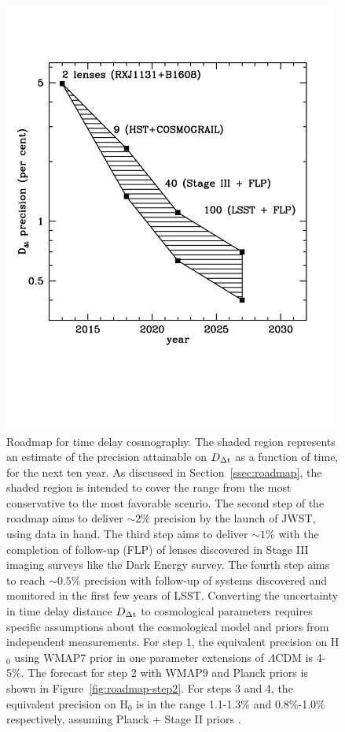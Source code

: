 \begin{figure}
\includegraphics[width=0.98\textwidth]{figures/roadmap.pdf}
\caption{Roadmap for time delay cosmography. The shaded region represents an estimate of the precision attainable on $D_{\Delta{\rm t}}$ as a function of time, for the next ten year. As discussed in Section~\ref{ssec:roadmap}, the shaded region is intended to cover the range from the most conservative to the most favorable scenrio. The second step of the roadmap aims to deliver $\sim2\%$ precision by the launch of JWST, using data in hand. The third step aims to deliver $\sim1\%$ with the completion of follow-up (FLP) of lenses discovered in Stage III imaging surveys like the Dark Energy survey. The fourth step aims to reach $\sim0.5\%$ precision with follow-up of systems discovered and monitored in the first few years of LSST. Converting the uncertainty in time delay distance $D_{\Delta{\rm t}}$ to cosmological parameters requires specific assumptions about the cosmological model and priors from independent measurements. For step 1, the equivalent precision on H$_0$ using WMAP7 prior in one parameter extensions of $\Lambda$CDM is 4-5\%. The forecast for step 2 with WMAP9 and Planck priors is shown in Figure~\ref{fig:roadmap-step2}. For steps 3 and 4, the equivalent precision on H$_0$ is in the range 1.1-1.3\% and 0.8\%-1.0\% respectively, assuming Planck + Stage II priors \citep{C+M09b}.}
\label{fig:roadmap}
\end{figure}

